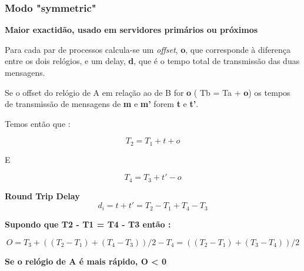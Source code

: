 \documentclass{article}
\begin{document}
\subsubsection{Modo "symmetric"}

\textbf{ Maior exactidão, usado em servidores primários ou próximos}


\par 

Para cada par de processos calcula-se um \textit{offset}, \textbf{o}, que corresponde à diferença entre os dois relógios, e um delay, \textbf{d}, que é o tempo total de transmissão das duas mensagens.


Se o offset do relógio de A em relação ao de B for \textbf{o} ( Tb = Ta + \textbf{o}) os tempos de transmissão de mensagens de \textbf{m} e \textbf{m'} forem \textbf{t} e \textbf{t'}.

\par 
Temos então que : 
\par

\begin{equation}
    T_{2}  = T_{1} + t + o
\end{equation}

E

\begin{equation}
    T_{4} = T_{3} + t' - o
\end{equation}


\textbf{Round Trip Delay}
\begin{equation}
    d_{i} = t + t'  = T_{2} - T_{1} + T_{4} - T_{3}
\end{equation}

\textbf{Supondo que T2 - T1 = T4 - T3 então : }

\begin{equation}
    O = T_{3} + (( T_{2} - T_{1}) + ( T_{4} - T_{3})) / 2  - T_{4} = (( T_{2} - T_{1}) + ( T_{3} - T_{4}))/ 2
\end{equation}


\textbf{Se o relógio de A é mais rápido, O < 0 }
\end{document}

